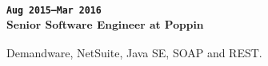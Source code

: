 \subsubsection{
\textsubscript{
\uppercase{\texttt{Aug 2015--Mar 2016}}\\
Senior Software Engineer at Poppin
}
}
Demandware, NetSuite, Java SE, SOAP and REST.
